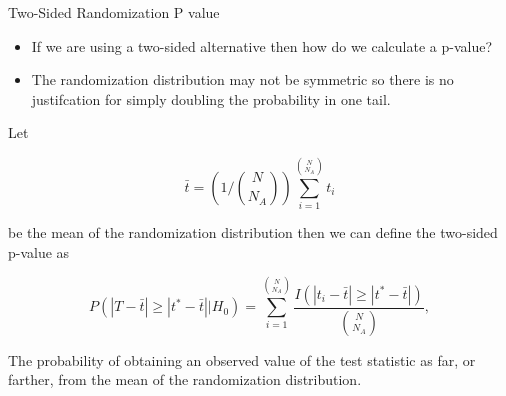 \documentclass[9pt,ignorenonframetext,]{beamer}
\begin{document}
\begin{frame}{Two-Sided Randomization P value}

\begin{itemize}
\item
  If we are using a two-sided alternative then how do we calculate a
  p-value?
\item
  The randomization distribution may not be symmetric so there is no
  justifcation for simply doubling the probability in one tail.
\end{itemize}

Let

\[{\bar t}=\left(1/{N \choose N_A}\right) {\sum_{i=1}^{N \choose N_A} t_i}\]

be the mean of the randomization distribution then we can define the
two-sided p-value as

\[P(\left|T-{\bar t}\right| \ge \left|t^{*}-{\bar t}\right||H_0) = \sum_{i=1}^{N \choose N_A} \frac{I(\left|t_i-{\bar t}\right| \ge \left|t^{*}-{\bar t}\right|)}{{N \choose N_A}},\]

The probability of obtaining an observed value of the test statistic as
far, or farther, from the mean of the randomization distribution.

\end{frame}
\end{document}
